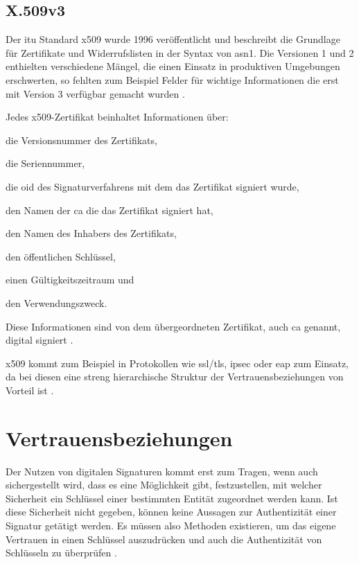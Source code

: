 \subsection{X.509v3}
\label{sec:GrundlagenDefinitionen:DigitaleSignaturen:Verfahren:x509}
Der \gls{itu} Standard \gls{x509} wurde 1996 veröffentlicht und beschreibt die Grundlage für Zertifikate und Widerrufslisten in der Syntax von \gls{asn1}. Die
Versionen 1 und 2 enthielten verschiedene Mängel, die einen Einsatz in produktiven Umgebungen erschwerten, so fehlten zum Beispiel Felder für wichtige
Informationen die erst mit Version 3 verfügbar gemacht wurden \cite{krypto-pki-internet}.

Jedes \gls{x509}-Zertifikat beinhaltet Informationen über:
\begin{itemize*}
    \item die Versionsnummer des Zertifikats,
    \item die Seriennummer,
    \item die \gls{oid} des Signaturverfahrens mit dem das Zertifikat signiert wurde,
    \item den Namen der \gls{ca} die das Zertifikat signiert hat,
    \item den Namen des Inhabers des Zertifikats,
    \item den öffentlichen Schlüssel,
    \item einen Gültigkeitszeitraum und
    \item den Verwendungszweck.
\end{itemize*}

Diese Informationen sind von dem übergeordneten Zertifikat, auch \gls{ca} genannt, digital signiert \cite{x509:ietf}.

\gls{x509} kommt zum Beispiel in Protokollen wie \gls{ssl}/\gls{tls}, \gls{ipsec} oder \gls{eap} zum Einsatz, da bei diesen eine streng hierarchische Struktur
der Vertrauensbeziehungen von Vorteil ist \cite{kits,tls:ietf}.

\section{Vertrauensbeziehungen}
\label{sec:GrundlagenDefinitionen:Vertrauen}
Der Nutzen von digitalen Signaturen kommt erst zum Tragen, wenn auch sichergestellt wird, dass es eine Möglichkeit gibt, festzustellen, mit welcher Sicherheit
ein Schlüssel einer bestimmten Entität zugeordnet werden kann. Ist diese Sicherheit nicht gegeben, können keine Aussagen zur Authentizität einer Signatur
getätigt werden. Es müssen also Methoden existieren, um das eigene Vertrauen in einen Schlüssel auszudrücken und auch die Authentizität von Schlüsseln
zu überprüfen \cite{krypto-pki-internet}.

